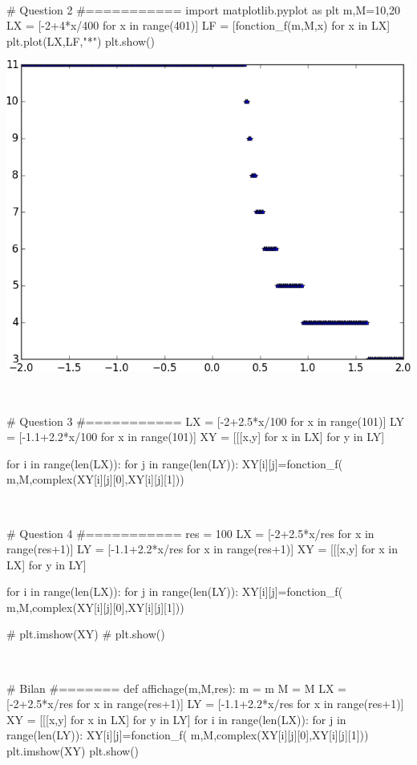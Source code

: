 \documentclass[10pt,fleqn]{article} %
\begin{document}
\begin{corrige}
$\quad$
\begin{python}
# Question 2
#===========
import matplotlib.pyplot as plt
m,M=10,20
LX = [-2+4*x/400 for x in range(401)]
LF = [fonction_f(m,M,x) for x in LX]
plt.plot(LX,LF,"*")
plt.show()
\end{python}
\end{corrige}
\begin{center}
\includegraphics[width=.4\linewidth]{programmes/Exercice_09/figure_1}
\end{center}
\begin{corrige}
$\quad$
\begin{python}
# Question 3
#===========
LX = [-2+2.5*x/100 for x in range(101)]
LY = [-1.1+2.2*x/100 for x in range(101)]
XY = [[[x,y] for x in LX] for y in LY]

for i in range(len(LX)):
    for j in range(len(LY)):
        XY[i][j]=fonction_f(
            m,M,complex(XY[i][j][0],XY[i][j][1]))
\end{python}
\end{corrige}

\begin{corrige}
$\quad$
\begin{python}

# Question 4
#===========
res = 100
LX = [-2+2.5*x/res for x in range(res+1)]
LY = [-1.1+2.2*x/res for x in range(res+1)]
XY = [[[x,y] for x in LX] for y in LY]

for i in range(len(LX)):
    for j in range(len(LY)):
        XY[i][j]=fonction_f(
        m,M,complex(XY[i][j][0],XY[i][j][1]))

# plt.imshow(XY)
# plt.show()
\end{python}
\end{corrige}

\begin{corrige}
$\quad$
\begin{python}

# Bilan 
#=======
def affichage(m,M,res):
    m = m
    M = M
    LX = [-2+2.5*x/res for x in range(res+1)]
    LY = [-1.1+2.2*x/res for x in range(res+1)]
    XY = [[[x,y] for x in LX] for y in LY]
    for i in range(len(LX)):
        for j in range(len(LY)):
            XY[i][j]=fonction_f(
                m,M,complex(XY[i][j][0],XY[i][j][1]))
    plt.imshow(XY)
    plt.show()
\end{python}
\end{corrige}
\end{document}
